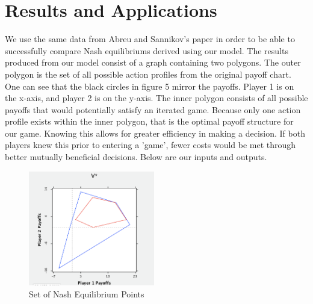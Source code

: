 \documentclass{article}
\begin{document}
\section{Results and Applications}

We use the same data from Abreu and Sannikov's paper in order to be able to successfully compare Nash equilibriums derived using our model. The results produced from our model consist of a graph containing two polygons. The outer polygon is the set of all possible action profiles from the original payoff chart. One can see that the black circles in figure 5 mirror the payoffs. Player 1 is on the x-axis, and player 2 is on the y-axis. The inner polygon consists of all possible payoffs that would potentially satisfy an iterated game. Because only one action profile exists within the inner polygon, that is the optimal payoff structure for our game. Knowing this allows for greater efficiency in making a decision. If both players knew this prior to entering a 'game', fewer costs would be met through better mutually beneficial decisions. Below are our inputs and outputs.

\begin{figure}[!ht]
\begin{minipage}[b]{1.0\linewidth}
  \centering
  \centerline{\includegraphics[width=5.5cm]{V-Star}}
\caption{Set of Nash Equilibrium Points}
\label{fig:res}
\end{minipage}
%
\end{figure}
\end{document}
